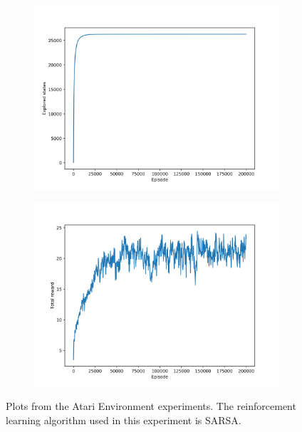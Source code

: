 \begin{figure}
\centering
\begin{subfigure}[h]{\linewidth}
\includegraphics[width=\linewidth]{images/atari-sarsa-explored-states.png}
\centering
\end{subfigure}
\hfill
\begin{subfigure}[h]{\linewidth}
\includegraphics[width=\linewidth]{images/atari-sarsa-total-reward.png}
\centering
\end{subfigure}
\caption{Plots from the Atari Environment experiments. The reinforcement learning algorithm used in this experiment is SARSA.}
\end{figure}

